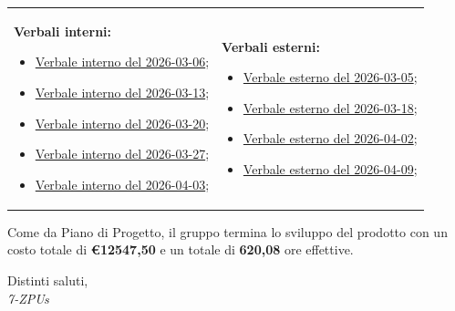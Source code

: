 \documentclass[a4paper,12pt]{article}
\begin{document}
\begin{tabular}{p{} p{}}

\textbf{Verbali interni:}
\begin{itemize}[leftmargin=*]
    \item \href{https://7-zpus.github.io/Docs/assets/3_PB/DocumentiInterni/Verbali/2026-03-06-VerbaleInterno.pdf}{Verbale interno del 2026-03-06};
    \item \href{https://7-zpus.github.io/Docs/assets/3_PB/DocumentiInterni/Verbali/2026-03-13-VerbaleInterno.pdf}{Verbale interno del 2026-03-13};
    \item \href{https://7-zpus.github.io/Docs/assets/3_PB/DocumentiInterni/Verbali/2026-03-20-VerbaleInterno.pdf}{Verbale interno del 2026-03-20};
    \item \href{https://7-zpus.github.io/Docs/assets/3_PB/DocumentiInterni/Verbali/2026-03-27-VerbaleInterno.pdf}{Verbale interno del 2026-03-27};
    \item \href{https://7-zpus.github.io/Docs/assets/3_PB/DocumentiInterni/Verbali/2026-04-03-VerbaleInterno.pdf}{Verbale interno del 2026-04-03};
\end{itemize}
&
\textbf{Verbali esterni:}
\begin{itemize}[leftmargin=*]
    \item \href{https://7-zpus.github.io/Docs/assets/3_PB/DocumentiEsterni/Verbali/2026-03-05-VerbaleEsterno.pdf}{Verbale esterno del 2026-03-05};
    \item \href{https://7-zpus.github.io/Docs/assets/3_PB/DocumentiEsterni/Verbali/2026-03-18-VerbaleEsterno.pdf}{Verbale esterno del 2026-03-18};
    \item \href{https://7-zpus.github.io/Docs/assets/3_PB/DocumentiEsterni/Verbali/2026-04-02-VerbaleEsterno.pdf}{Verbale esterno del 2026-04-02};
    \item \href{https://7-zpus.github.io/Docs/assets/3_PB/DocumentiEsterni/Verbali/2026-04-09-VerbaleEsterno.pdf}{Verbale esterno del 2026-04-09};
\end{itemize}

\end{tabular}

\vspace{1cm}

Come da Piano di Progetto, il gruppo termina lo sviluppo del prodotto con un costo totale di \textbf{€12547,50} e un totale di \textbf{620,08} ore effettive.

\vspace{0.8cm}

Distinti saluti,\\
\vspace{0.3cm}
\textit{7-ZPUs}
\end{document}
